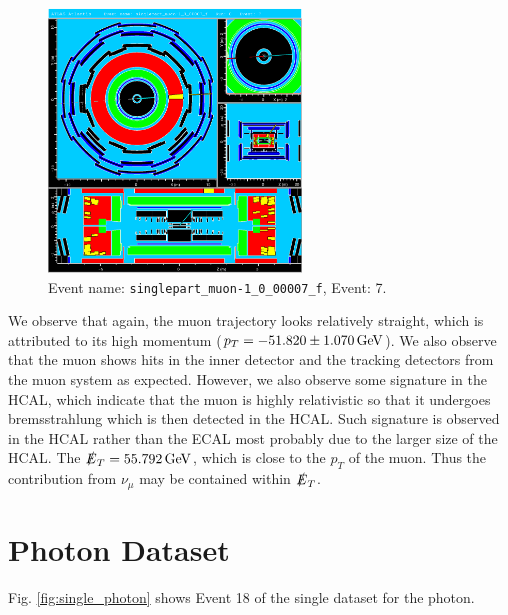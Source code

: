 \documentclass[a4paper]{report}
\numberwithin{equation}{section}
\begin{document}
\begin{figure}[htpb]
    \centering
    \includegraphics[width=0.6\textwidth]{muon_event7.eps}
    \caption{Event name: \texttt{singlepart\_muon-1\_0\_00007\_f}, Event: 7. }
    \label{fig:single_muon}
\end{figure}

We observe that again, the muon trajectory looks relatively straight, which is attributed to its high momentum ($p_T = \SI{-51.82 \pm 1.070}{\giga\electronvolt}$).
We also observe that the muon shows hits in the inner detector and the tracking detectors from the muon system as expected. 
However, we also observe some signature in the HCAL, which indicate that the muon is highly relativistic so that it 
undergoes bremsstrahlung which is then detected in the HCAL. Such signature is observed in the HCAL rather than the ECAL most probably
due to the larger size of the HCAL. The $\slashed{E}_T = \SI{55.792}{\giga\electronvolt}$, which is close to the $p_T$ of the muon.
Thus the contribution from $\nu_\mu$ may be contained within $\slashed{E}_T$.

\section{Photon Dataset}

Fig. \ref{fig:single_photon} shows Event 18 of the single dataset for the photon.
\end{document}
